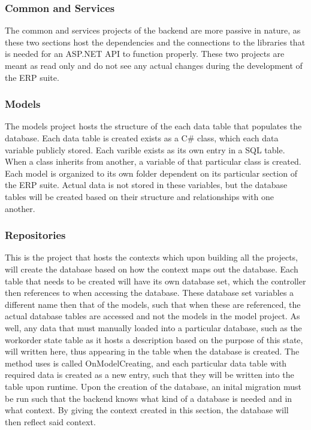 {{{{{{{{{{{{{\subsubsection{Common and Services}
The common and services projects of the backend are more passive in nature, as these two sections host the dependencies and the connections to the libraries that is needed for an ASP.NET API to function properly. These two projects are meant as read only and do not see any actual changes during the development of the ERP suite. 

\subsubsection{Models}
The models project hosts the structure of the each data table that populates the database. Each data table is created exists as a C\# class, which each data variable publicly stored. Each varible exists as its own entry in a SQL table. When a class inherits from another, a variable of that particular class is created. Each model is organized to its own folder dependent on its particular section of the ERP suite. Actual data is not stored in these variables, but the database tables will be created based on their structure and relationships with one another.

\subsubsection{Repositories}
This is the project that hosts the contexts which upon building all the projects, will create the database based on how the context maps out the database. Each table that needs to be created will have its own database set, which the controller then references to when accessing the database. These database set variables a different name then that of the models, such that when these are referenced, the actual database tables are accessed and not the models in the model project. As well, any data that must manually loaded into a particular database, such as the workorder state table as it hosts a description based on the purpose of this state, will written here, thus appearing in the table when the database is created. The method uses is called OnModelCreating, and each particular data table with required data is created as a new entry, such that they will be written into the table upon runtime. Upon the creation of the database, an inital migration must be run such that the backend knows what kind of a database is needed and in what context. By giving the context created in this section, the database will then reflect said context. 

}}}}}}}}}}}}}
